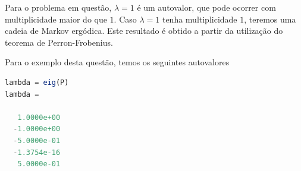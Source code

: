 \begin{questions}
\begin{solution}
\begin{parts}
Para o problema em questão, $\lambda = 1$ é um autovalor, que pode ocorrer com
multiplicidade maior do que $1$. Caso $\lambda = 1$ tenha multiplicidade $1$,
teremos uma cadeia de Markov ergódica. Este resultado é obtido a partir da
utilização do teorema de Perron-Frobenius.

Para o exemplo desta questão, temos os seguintes autovalores
\begin{lstlisting}[language=Octave]
lambda = eig(P)
lambda =

   1.0000e+00
  -1.0000e+00
  -5.0000e-01
  -1.3754e-16
   5.0000e-01
\end{lstlisting}

\end{parts}
\end{solution}
\end{questions}

